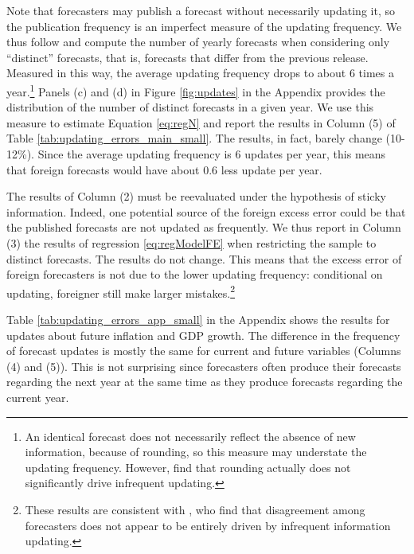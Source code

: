 Note that forecasters may publish a forecast without necessarily updating it, so the publication frequency is an imperfect measure of the updating frequency. We thus follow \citet{Andrade2013} and compute the number of yearly forecasts when considering only ``distinct'' forecasts, that is, forecasts that differ from the previous release. Measured in this way, the average updating frequency drops to about 6 times a year.\footnote{An identical forecast does not necessarily reflect the absence of new information, because of rounding, so this measure may understate the updating frequency. However, \citet{Andrade2013} find that rounding actually does not significantly drive infrequent updating.} Panels (c) and (d) in Figure \ref{fig:updates} in the Appendix provides the distribution of the number of distinct forecasts in a given year. We use this measure to estimate Equation \eqref{eq:regN} and report the results in Column (5) of Table \ref{tab:updating_errors_main_small}. The results, in fact, barely change (10-12\%). Since the average updating frequency is 6 updates per year, this means that foreign forecasts would have about 0.6 less update per year.

The results of Column (2) must be reevaluated under the hypothesis of sticky information. Indeed, one potential source of the foreign excess error could be that the published forecasts are not updated as frequently. We thus report in Column (3) the results of regression \eqref{eq:regModelFE} when restricting the sample to distinct forecasts. The results do not change. This means that the excess error of foreign forecasters is not due to the lower updating frequency: conditional on updating, foreigner still make larger mistakes.\footnote{These results are consistent with \citet{Andrade2013}, who find that disagreement among forecasters does not appear to be entirely driven by infrequent information updating.}

Table \ref{tab:updating_errors_app_small} in the Appendix shows the results for updates about future inflation and GDP growth. The difference in the frequency of forecast updates is mostly the same for current and future variables (Columns (4) and (5)). This is not surprising since forecasters often produce their forecasts regarding the next year at the same time as they produce forecasts regarding the current year. 